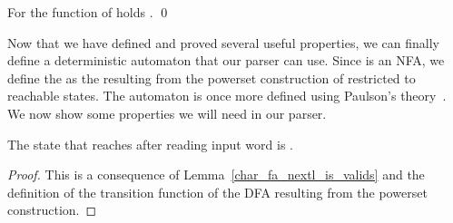 \begin{isabellebody}
\begin{isamarkuptext}
\begin{lemma}\label{char_fa_nextl_is_valids}
For the  function of  holds .
\qed
\end{lemma}%
\end{isamarkuptext}\isamarkuptrue%
%
\isadelimdocument
%
\endisadelimdocument
%
\isatagdocument
%
\isamarkuptrue%
%
\endisatagdocument
{\isafolddocument}%
%
\isadelimdocument
%
\endisadelimdocument
%
\begin{isamarkuptext}%
Now that we have defined  and proved several useful properties, we can finally
define a deterministic automaton that our parser can use. Since  is an NFA, we 
define the   as the  resulting from 
the powerset construction of  restricted to reachable states. The automaton is once more defined using 
Paulson's theory~\cite{Paulson}. We now show some properties we will need in our parser.

\begin{corollary}\label{nextl_dfa_LR0_is_valids}
The state that  reaches after reading input word \isa{{\isasymgamma}} is .
\begin{proof}
This is a consequence of Lemma~\ref{char_fa_nextl_is_valids} and the definition of the transition 
function of the DFA resulting from the powerset construction.
\end{proof}
\end{corollary}


\end{isamarkuptext}
\end{isabellebody}
